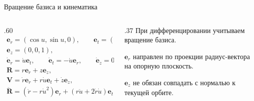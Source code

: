 \documentclass[11pt,aspectratio=169,t]{beamer}
\newcommand{\eqcompact}{\fontsize{10}{12}\selectfont}
\begin{document}
\begin{frame}{Вращение базиса и кинематика}
\relax
\begin{columns}[T,onlytextwidth]
\begin{column}{.60\textwidth}
{\eqcompact\derivationmathspacing
\[
\begin{gathered}
 \boldsymbol e_r=(\cos u,\sin u,0),\qquad
 \boldsymbol e_t=(-\sin u,\cos u,0),\\[3pt]
 \boldsymbol e_z=(0,0,1),\\[20pt]
 \dot{\boldsymbol e}_r=\dot u\boldsymbol e_t,\qquad
 \dot{\boldsymbol e}_t=-\dot u\boldsymbol e_r,\qquad
 \dot{\boldsymbol e}_z=0,\\[20pt]
 \boldsymbol R=r\boldsymbol e_r+z\boldsymbol e_z,\\[5pt]
 \boldsymbol V=\dot r\boldsymbol e_r+r\dot u\boldsymbol e_t+\dot z\boldsymbol e_z,\\[20pt]
 \ddot{\boldsymbol R}=(\ddot r-r\dot u^2)\boldsymbol e_r
        +(r\ddot u+2\dot r\dot u)\boldsymbol e_t
        +\ddot z\boldsymbol e_z.
\end{gathered}
\]
}
\end{column}
\begin{column}{.37\textwidth}
\RaggedRight
При дифференцировании учитываем вращение базиса.\par\medskip
$\boldsymbol e_r$ направлен по проекции радиус-вектора на опорную плоскость.\par\medskip
$\boldsymbol e_z$ не обязан совпадать с нормалью к текущей орбите.
\end{column}
\end{columns}
\end{frame}
\end{document}
